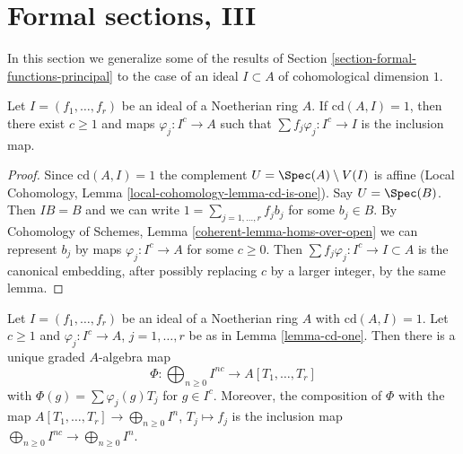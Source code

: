 \section{Formal sections, III}
\label{section-formal-sections-cd-one}

\noindent
In this section we generalize some of the results of
Section \ref{section-formal-functions-principal}
to the case of an ideal $I \subset A$ of cohomological dimension $1$.

\begin{lemma}
\label{lemma-cd-one}
Let $I = (f_1, \ldots, f_r)$ be an ideal of a Noetherian ring $A$.
If $\text{cd}(A, I) = 1$, then there exist $c \geq 1$ and maps
$\varphi_j : I^c \to A$ such that $\sum f_j \varphi_j : I^c \to I$
is the inclusion map.
\end{lemma}

\begin{proof}
Since $\text{cd}(A, I) = 1$ the complement $U = \Spec(A) \setminus V(I)$
is affine (Local Cohomology, Lemma \ref{local-cohomology-lemma-cd-is-one}).
Say $U = \Spec(B)$. Then $IB = B$
and we can write $1 = \sum_{j = 1, \ldots, r} f_j b_j$
for some $b_j \in B$. By
Cohomology of Schemes, Lemma \ref{coherent-lemma-homs-over-open}
we can represent $b_j$ by maps $\varphi_j : I^c \to A$
for some $c \geq 0$. Then $\sum f_j \varphi_j : I^c \to I \subset A$
is the canonical embedding, after possibly replacing $c$ by a larger
integer, by the same lemma.
\end{proof}

\begin{lemma}
\label{lemma-cd-one-extend}
Let $I = (f_1, \ldots, f_r)$ be an ideal of a Noetherian ring $A$
with $\text{cd}(A, I) = 1$. Let $c \geq 1$ and $\varphi_j : I^c \to A$,
$j = 1, \ldots, r$ be as in Lemma \ref{lemma-cd-one}.
Then there is a unique graded $A$-algebra map
$$
\Phi : \bigoplus\nolimits_{n \geq 0} I^{nc} \to A[T_1, \ldots, T_r]
$$
with $\Phi(g) = \sum \varphi_j(g) T_j$ for $g \in I^c$.
Moreover, the composition of $\Phi$ with the map
$A[T_1, \ldots, T_r] \to \bigoplus_{n \geq 0} I^n$,
$T_j \mapsto f_j$ is the inclusion map
$\bigoplus_{n \geq 0} I^{nc} \to \bigoplus_{n \geq 0} I^n$.
\end{lemma}

